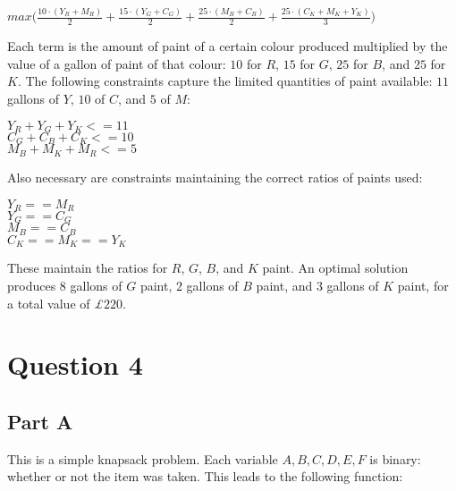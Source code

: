 \documentclass[11pt]{article} %
\begin{document}
\begin{center}

$max \bigl( \frac{10 \cdot (Y_R + M_R)}{2} + \frac{15 \cdot (Y_G + C_G)}{2} + \frac{25 \cdot (M_B + C_B)}{2} + \frac{25 \cdot (C_K + M_K + Y_K)}{3}\bigr)$

\end{center}

Each term is the amount of paint of a certain colour produced multiplied by the value of a gallon of paint of that colour: $10$ for $R$, $15$ for $G$, $25$ for $B$, and $25$ for $K$. The following constraints capture the limited quantities of paint available: $11$ gallons of $Y$, $10$ of $C$, and $5$ of $M$:

\begin {center}

$Y_R + Y_G + Y_K <= 11$ \\
$C_G + C_B + C_K <= 10$ \\
$M_B + M_K +M_R <= 5$ \\

\end{center}

Also necessary are constraints maintaining the correct ratios of paints used:

\begin{center}

$Y_R == M_R$ \\
$Y_G == C_G$ \\
$M_B == C_B$ \\
$C_K == M_K == Y_K$ \\

\end{center}

These maintain the ratios for $R$, $G$, $B$, and $K$ paint. An optimal solution produces $8$ gallons of $G$ paint, $2$ gallons of $B$ paint, and $3$ gallons of $K$ paint, for a total value of \textit{£}$220$.

\clearpage

\section*{Question 4}

\subsection*{Part A} 

This is a simple knapsack problem. Each variable $A, B, C, D, E, F$ is binary: whether or not the item was taken. This leads to the following function:
\end{document}
